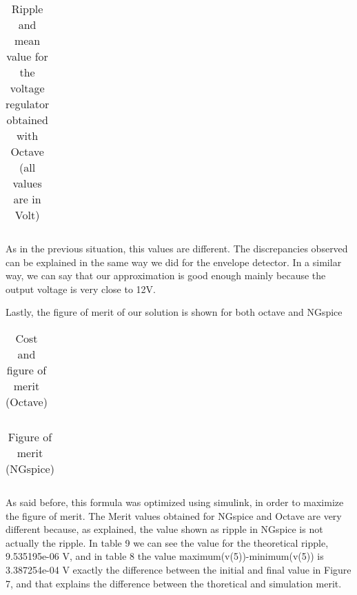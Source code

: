 \begin{table}[h!]
\centering
\begin{tabularx}{0.9\textwidth} {
  | >{\raggedright\arraybackslash}X
  | >{\raggedleft\arraybackslash}X | }
 \hline

\end{tabularx}
\caption{\label{tab:Table 9} Ripple and mean value for the voltage regulator obtained with Octave (all values are in Volt)}
\end{table}
\vspace{5mm}

\par As in the previous situation, this values are different. The discrepancies observed can be explained in the same way we did for the envelope detector. In a similar way, we can say that our approximation is good enough mainly because the output voltage is very close to 12V.
\par Lastly, the figure of merit of our solution is shown for both octave and NGspice

\vspace{5mm}
\begin{table}[h!]
\centering
\begin{tabularx}{0.9\textwidth} {
  | >{\raggedright\arraybackslash}X
  | >{\raggedleft\arraybackslash}X | }
 \hline

\end{tabularx}
\caption{\label{tab:Table 10} Cost and figure of merit (Octave)}
\end{table}
\vspace{5mm}

\vspace{5mm}
\begin{table}[h!]
\centering
\begin{tabularx}{0.9\textwidth} {
  | >{\raggedright\arraybackslash}X
  | >{\raggedleft\arraybackslash}X | }
 \hline

\end{tabularx}
\caption{\label{tab:Table 11} Figure of merit (NGspice)}
\end{table}
\vspace{5mm}

\par As said before, this formula was optimized using simulink, in order to maximize the figure of merit. The Merit values obtained for NGspice and Octave are very different because, as explained, the value shown as ripple in NGspice is not actually the ripple. In table 9 we can see the value for the theoretical ripple, 9.535195e-06 V, and in table 8 the value maximum(v(5))-minimum(v(5)) is 3.387254e-04 V exactly the difference between the initial and final value in Figure 7, and that explains the difference between the thoretical and simulation merit. 

